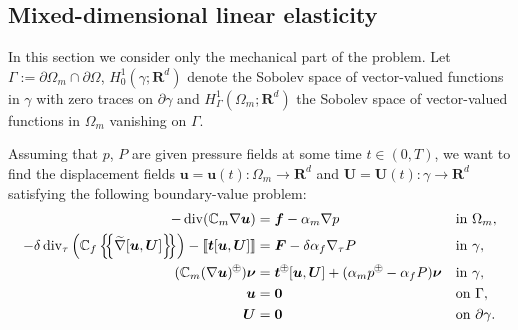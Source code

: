 \documentclass[a4paper]{article}
\def\agrad{\widetilde\nabla}
\def\avg#1{\left\{\mskip-5mu\left\{#1\right\}\mskip-5mu\right\}}
\def\CC{\tn C}
\def\div{\operatorname{div}}
\def\FF{\vc F}
\def\ff{\vc f}
\def\grad{\nabla}
\def\jmp#1{\left\llbracket #1 \right\rrbracket}
\def\nnu{\vc\nu}
\def\prtl{\partial}
\def\Real{{\mathbf R}}
\def\tn#1{{\mathbb{#1}}}    %
\def\tt{\vc t}
\def\U{\vc U}
\def\uu{\vc u}
\def\vc#1{\mathbf{\boldsymbol{#1}}}     %
\newcommand{\opm}{ %
  {\mathbin{
    \mathchoice
      {\buildcirclepm{\displaystyle     }{0.14ex}{0.95}{0.05ex}{.7}}
      {\buildcirclepm{\textstyle        }{0.14ex}{0.95}{0.05ex}{.7}}
      {\buildcirclepm{\scriptstyle      }{0.13ex}{0.955}{0.04ex}{.55}}
      {\buildcirclepm{\scriptscriptstyle}{0.08ex}{0.95}{0.03ex}{.45}}
  }} 
}
\newcommand\buildcirclepm[5]{%
  \begin{tikzpicture}[baseline=(X.base), inner sep=-#5, outer sep=-.65]
    \node[draw,circle,line width=#4] (X)  {\footnotesize\raisebox{#2}{\scalebox{#3}{$#1\pm$}}};
  \end{tikzpicture}%
}
\begin{document}
\subsection{Mixed-dimensional linear elasticity}\label{sec:wellposedness_elasticity}

In this section we consider only the mechanical part of the problem.
Let $\Gamma:=\prtl\Omega_m\cap\prtl\Omega$, $H^1_0(\gamma;\Real^d)$ denote the Sobolev space of vector-valued functions in $\gamma$ with zero traces on $\prtl\gamma$ and $H^1_\Gamma(\Omega_m;\Real^d)$ the Sobolev space of vector-valued functions in $\Omega_m$ vanishing on $\Gamma$.

Assuming that $p$, $P$ are given pressure fields at some time $t\in(0,T)$, we want to find the displacement fields $\uu=\uu(t):\Omega_m\to\Real^d$ and $\U=\U(t):\gamma\to\Real^d$ satisfying the following boundary-value problem:
\begin{subequations}\label{eq:lin_el_problem}
\begin{align}
-\div(\CC_m\nabla\uu) &= \ff -\alpha_m\nabla p &&\mbox{in }\Omega_m,\\
-\delta\div_\tau\left(\CC_f\avg{\agrad[\uu,\U]} \right) - \jmp{\tt[\uu,\U]} &= \FF - \delta\alpha_f\grad_\tau P &&\mbox{in }\gamma,\\
(\CC_m(\nabla\uu)^\opm)\nnu &= \tt^\opm[\uu,\U] + (\alpha_m p^\opm-\alpha_f P)\nnu &&\mbox{in }\gamma,\\
\uu &=\vc0&&\mbox{on }\Gamma,\\
\U &=\vc 0&&\mbox{on }\prtl\gamma.
\end{align}
\end{subequations}
\end{document}
